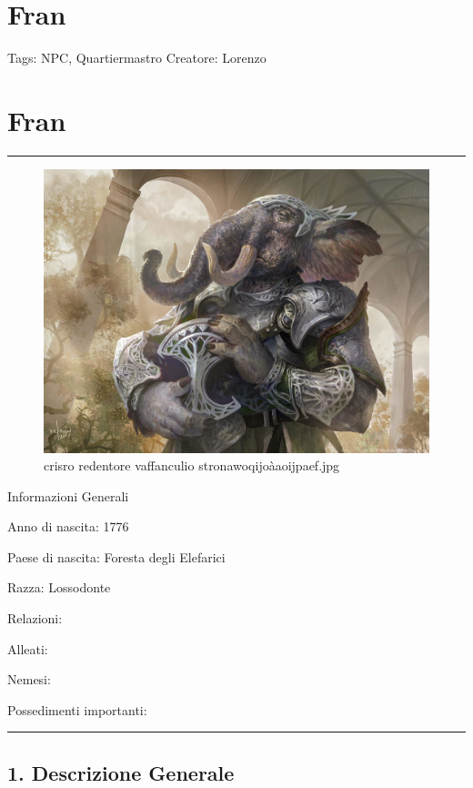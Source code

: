 \section{Fran}\label{fran}

Tags: NPC, Quartiermastro Creatore: Lorenzo

\section{Fran}\label{fran-1}

\begin{center}\rule{0.5\linewidth}{0.5pt}\end{center}

\begin{figure}
\centering
\includegraphics{crisro_redentore_vaffanculio_stronawoqijoaoijpaef.jpg}
\caption{crisro redentore vaffanculio stronawoqijoàaoijpaef.jpg}
\end{figure}

Informazioni Generali

Anno di nascita: 1776

Paese di nascita: Foresta degli Elefarici

Razza: Lossodonte

Relazioni:

Alleati:

Nemesi:

Possedimenti importanti:

\begin{center}\rule{0.5\linewidth}{0.5pt}\end{center}

\subsection{1. Descrizione Generale}\label{descrizione-generale}

